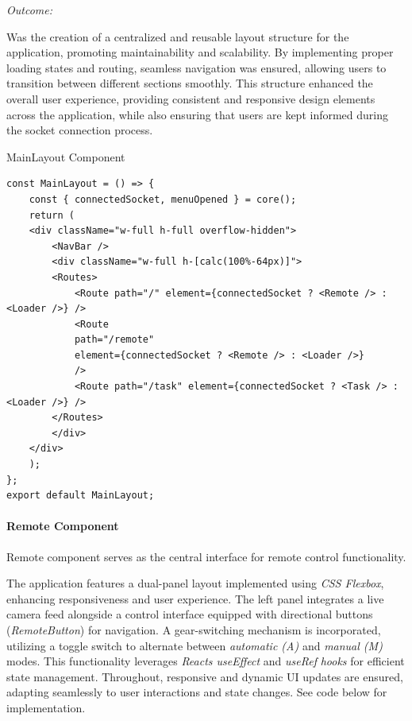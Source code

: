 \documentclass[../../main]{subfiles}
\begin{document}
\emph{Outcome:}

Was the creation of a centralized and reusable layout structure for the
application, promoting maintainability and scalability. By implementing
proper loading states and routing, seamless navigation was ensured,
allowing users to transition between different sections smoothly. This
structure enhanced the overall user experience, providing consistent and
responsive design elements across the application, while also ensuring
that users are kept informed during the socket connection process.

\newpage
\begin{codebox}[label=judFig10]{MainLayout Component}
\begin{verbatim}
const MainLayout = () => {
    const { connectedSocket, menuOpened } = core();
    return (
    <div className="w-full h-full overflow-hidden">
        <NavBar />
        <div className="w-full h-[calc(100%-64px)]">
        <Routes>
            <Route path="/" element={connectedSocket ? <Remote /> : <Loader />} />
            <Route
            path="/remote"
            element={connectedSocket ? <Remote /> : <Loader />}
            />
            <Route path="/task" element={connectedSocket ? <Task /> : <Loader />} />
        </Routes>
        </div>
    </div>
    );
};
export default MainLayout;
\end{verbatim}
\end{codebox}

\paragraph{Remote Component}

Remote component serves as the central interface for remote control
functionality.

The application features a dual-panel layout implemented using \emph{CSS
Flexbox}, enhancing responsiveness and user experience. The left panel
integrates a live camera feed alongside a control interface equipped
with directional buttons (\emph{RemoteButton}) for navigation. A
gear-switching mechanism is incorporated, utilizing a toggle switch to
alternate between \emph{automatic (A)} and \emph{manual (M)} modes. This
functionality leverages \emph{React\textquotesingle s useEffect} and
\emph{useRef} \emph{hooks} for efficient state management. Throughout,
responsive and dynamic UI updates are ensured, adapting seamlessly to
user interactions and state changes. See code below for implementation.
\end{document}
